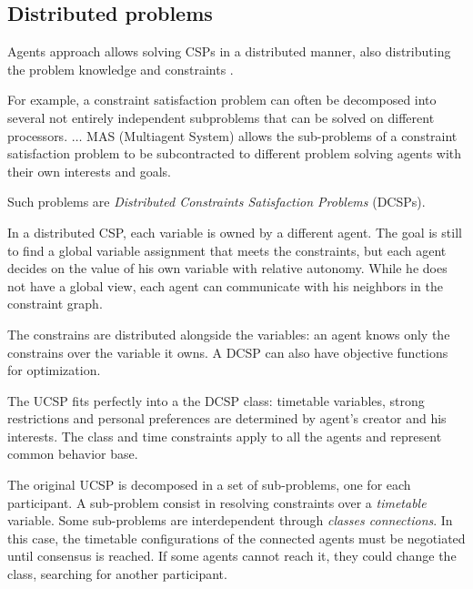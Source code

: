 \documentclass[ThesisDoc]{subfiles}
\begin{document}
\bigskip

\todo {}



\subsection{Distributed problems}
Agents approach allows solving CSPs in a distributed manner, also distributing
the problem knowledge and constraints
\cite{DCSPagent1998, DCSP2013, CSPagent2014, MAS, MAS-Survey}.

\begin{displayquote} %
  For example, a constraint satisfaction problem can often be
  decomposed into several not entirely independent
  subproblems that can be solved on different processors. $\dots$
  MAS (Multiagent System) allows the sub-problems of a constraint satisfaction
  problem to be subcontracted to different problem solving agents with their own
  interests and goals.
\end{displayquote}

\noindent
Such problems are \emph{Distributed Constraints Satisfaction Problems} (DCSPs).
\begin{displayquote} %
  In a distributed CSP, each variable is owned by a different agent. The goal is
  still to find a global variable assignment that meets the constraints, but each agent
  decides on the value of his own variable with relative autonomy. While he does
  not have a global view, each agent can communicate with his neighbors in the
  constraint graph.
\end{displayquote}

  The constrains are distributed alongside the variables: an agent knows only the
constrains over the variable it owns. A DCSP can also have objective functions for
optimization.

  The UCSP fits perfectly into a the DCSP class: timetable variables,
strong restrictions and personal preferences are determined by agent's creator
and his interests. The class and time constraints apply to all the agents and
represent common behavior base.

  The original UCSP is decomposed in a set of sub-problems, one for each participant.
A sub-problem consist in resolving constraints over a \emph{timetable} variable.
Some sub-problems are interdependent through \emph{classes connections}. In this
case, the timetable configurations of the connected agents must be negotiated
until consensus is reached. If some agents cannot reach it, they could change the
class, searching for another participant.
\end{document}

